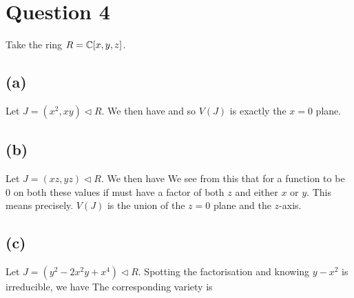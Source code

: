 \documentclass{article}
\begin{document}
\section{Question 4}
Take the ring $R = \mathbb{C}[x,y,z]$.

\subsection{(a)}

Let $J = (x^2,xy) \vartriangleleft R$. We then have 
and so 
$V(J)$ is exactly the $x=0$ plane. 
\subsection{(b)}

Let $J = (xz,yz) \vartriangleleft R$. We then have 
We see from this that for a function to be 0 on both these values if must have a factor of both $z$ and either $x$ or $y$. This means 
precisely. $V(J)$ is the union of the $z=0$ plane and the $z$-axis. 

\subsection{(c)}
Let $J = (y^2 - 2x^2y + x^4) \vartriangleleft R$. Spotting the factorisation 
and knowing $y-x^2$ is irreducible, we have 
The corresponding variety is 
\end{document}

